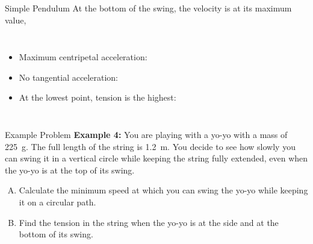 \documentclass[12pt,compress,aspectratio=169]{beamer}
\newcommand{\mb}[1]{\ensuremath\mathbf{#1}}
\newcommand{\eq}[2]{\vspace{#1}{\Large\begin{displaymath}#2\end{displaymath}}}
\begin{document}
\begin{frame}{Simple Pendulum}
  At the bottom of the swing, the velocity is at its maximum value,
  
  \vspace{.1in}\begin{columns}

    \begin{itemize}
    \item Maximum centripetal acceleration:

      \eq{-.25in}{
        a_r=\frac{v^2}{r}
      }
    \item No tangential acceleration:

      \eq{-.25in}{
        a_\theta=0
      }
    \item At the lowest point, tension is the highest:

      \eq{-.3in}{
        T=w+F_r=m\left(g+\frac{v^2}{r}\right)
      }
    \end{itemize}
  \end{columns}
\end{frame}



\begin{frame}{Example Problem}
  \textbf{Example 4:} You are playing with a yo-yo with a mass of
  \SI{225}{\gram}. The full length of the string is \SI{1.2}{\metre}. You
  decide to see how slowly you can swing it in a vertical circle while keeping
  the string fully extended, even when the yo-yo is at the top of its swing.
  \begin{enumerate}[A.]
  \item Calculate the minimum speed at which you can swing the yo-yo while
    keeping it on a circular path.
  \item Find the tension in the string when the yo-yo is at the side and at the
    bottom of its swing. 
  \end{enumerate}
\end{frame}
\end{document}
